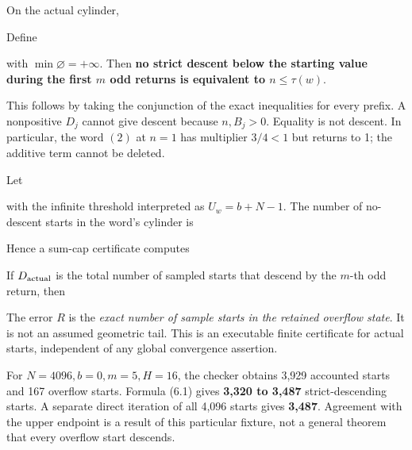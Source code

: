 
On the actual cylinder,


Define


with \(\min\varnothing=+\infty\). Then \textbf{no strict descent below
the starting value during the first \(m\) odd returns is equivalent to
\(n\le\tau(w)\)}.

This follows by taking the conjunction of the exact inequalities for
every prefix. A nonpositive \(D_j\) cannot give descent because
\(n,B_j>0\). Equality is not descent. In particular, the word \((2)\) at
\(n=1\) has multiplier \(3/4<1\) but returns to 1; the additive term
cannot be deleted.

Let


with the infinite threshold interpreted as \(U_w=b+N-1\). The number of
no-descent starts in the word's cylinder is


Hence a sum-cap certificate computes


If \(D_{\rm actual}\) is the total number of sampled starts that descend
by the \(m\)-th odd return, then


The error \(R\) is the \emph{exact number of sample starts in the
retained overflow state}. It is not an assumed geometric tail. This is
an executable finite certificate for actual starts, independent of any
global convergence assertion.

For \(N=4096,b=0,m=5,H=16\), the checker obtains 3,929 accounted starts
and 167 overflow starts. Formula (6.1) gives \textbf{3,320 to 3,487}
strict-descending starts. A separate direct iteration of all 4,096
starts gives \textbf{3,487}. Agreement with the upper endpoint is a
result of this particular fixture, not a general theorem that every
overflow start descends.

